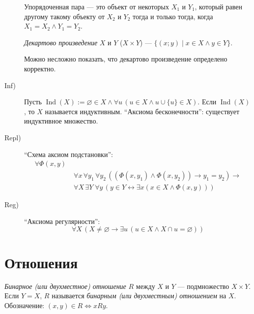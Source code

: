 \documentclass[12pt,a4paper]{article}
\DeclareMathOperator{\Ind}{Ind}
\newcommand{\ZF}{\ensuremath{\mathrm{ZF}}\xspace}
\newcommand{\ZFC}{\ensuremath{\mathrm{ZFC}}\xspace}
\begin{document}
\begin{definition}[аксиомы \ZFC (= \ZF (аксиомы Цермело-Френкеля) + C (аксиома выбора))]
\begin{description}
                \begin{definition}
                    Упорядоченная пара --- это объект от некоторых $X_1$ и $Y_1$, который равен другому такому объекту от $X_2$ и $Y_2$ тогда и только тогда, когда $X_1 = X_2 \wedge Y_1 = Y_2$.
                \end{definition}

                \begin{definition}
                    \emph{Декартово произведение} $X$ и $Y$ ($X \times Y$) --- $\{(x; y) \mid x \in X \wedge y \in Y\}$. 
                \end{definition}

                \begin{remark}
                    Можно несложно показать, что декартово произведение определено корректно.
                \end{remark}
            \item[Inf)] Пусть $\Ind(X) := \varnothing \in X \wedge \forall u\, (u \in X \wedge u \cup \{u\} \in X)$. Если $\Ind(X)$, то $X$ называется индуктивным. ``Аксиома бесконечности'': существует индуктивное множество.
            \item[Repl)] ``Схема аксиом подстановки'':
                \begin{align*}
                    \forall \Phi(x, y)\;&\\
                    &\forall x\, \forall y_1\, \forall y_2\, ((\Phi(x, y_1) \wedge \Phi(x, y_2)) \rightarrow y_1 = y_2) \rightarrow\\
                    &\forall X\, \exists Y\; \forall y\, (y \in Y \leftrightarrow \exists x (x \in X \wedge \Phi(x, y)))
                \end{align*}
            \item[Reg)] ``Аксиома регулярности'':
                \[
                    \forall X\, (X\neq \varnothing \rightarrow \exists u\, (u\in X \wedge X \cap u = \varnothing))
                \]
        \end{description}
    \end{definition}

    \section{Отношения}

    \begin{definition}
        \emph{Бинарное (или двухместное) отношение} $R$ между $X$ и $Y$ --- подмножество $X \times Y$. Если $Y = X$, $R$ называется \emph{бинарным (или двухместным) отношением} на $X$.\\
        Обозначение: $(x, y) \in R \Leftrightarrow xRy$.
    \end{definition}
\end{document}
